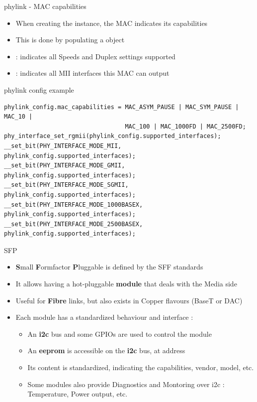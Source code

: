 \begin{frame}[fragile]{phylink - MAC capabilities}
	\begin{itemize}
		\item When creating the  instance, the MAC indicates its capabilities
		\item This is done by populating a  object
		\item {} : indicates all Speeds and Duplex settings supported
		\item {} : indicates all MII interfaces this MAC can output
	\end{itemize}
	\begin{block}{phylink config example}
	{\fontsize{9}{10}
	\begin{verbatim}
phylink_config.mac_capabilities = MAC_ASYM_PAUSE | MAC_SYM_PAUSE | MAC_10 |
                                  MAC_100 | MAC_1000FD | MAC_2500FD;
phy_interface_set_rgmii(phylink_config.supported_interfaces);
__set_bit(PHY_INTERFACE_MODE_MII, phylink_config.supported_interfaces);
__set_bit(PHY_INTERFACE_MODE_GMII, phylink_config.supported_interfaces);
__set_bit(PHY_INTERFACE_MODE_SGMII, phylink_config.supported_interfaces);
__set_bit(PHY_INTERFACE_MODE_1000BASEX, phylink_config.supported_interfaces);
__set_bit(PHY_INTERFACE_MODE_2500BASEX, phylink_config.supported_interfaces);
	\end{verbatim}
	}
	\end{block}
\end{frame}

\begin{frame}{SFP}
	\begin{itemize}
		\item \textbf{S}mall \textbf{F}ormfactor \textbf{P}luggable is defined by the SFF standards
		\item It allows having a hot-pluggable \textbf{module} that deals with the Media side
		\item Useful for \textbf{Fibre} links, but also exists in Copper flavours (BaseT or DAC)
		\item Each module has a standardized behaviour and interface :
			\begin{itemize}
				\item An \textbf{i2c} bus and some GPIOs are used to control the module
				\item An \textbf{eeprom} is accessible on the \textbf{i2c} bus, at address 
				\item Its content is standardized, indicating the capabilities, vendor, model, etc.
				\item Some modules also provide Diagnostics and Montoring over i2c : Temperature, Power output, etc.
			\end{itemize}
	\end{itemize}
\end{frame}

